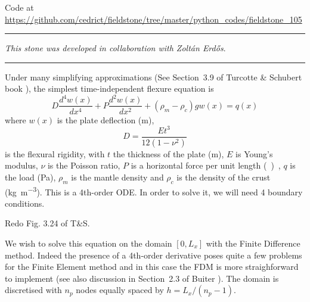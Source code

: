 

\begin{center}
Code at \url{https://github.com/cedrict/fieldstone/tree/master/python_codes/fieldstone_105}
\end{center}

\par\noindent\rule{\textwidth}{0.4pt}

{\sl This stone was developed in collaboration with Zolt{\'a}n Erd{\H{o}}s}. 

\par\noindent\rule{\textwidth}{0.4pt}


Under many simplifying approximations (See Section~3.9 of Turcotte \& Schubert book \cite{tusc}), 
the simplest time-independent flexure equation is
\[
D \frac{d^4w(x)}{dx^4} + P \frac{d^2w(x)}{dx^2} + (\rho_m-\rho_c)g w(x) = q(x)
\]
where $w(x)$ is the plate deflection (\si{m}), 
\[
D=\frac{E t^3}{12(1-\nu^2)}
\]
is the flexural rigidity, with $t$ the thickness of the plate (\si{m}), 
$E$ is Young's modulus, $\nu$ is the Poisson ratio, 
$P$ is a horizontal force per unit length (\si{\kg\per\square\metre\square\sec}),  
$q$ is the load (\si{\pascal}), 
$\rho_m$ is the mantle density and $\rho_c$ is the density of the crust (\si{\kg\per\cubic\metre}).
This is a 4th-order ODE. In order to solve it, we will need 4 boundary conditions.

Redo Fig. 3.24 of T\&S. 

We wish to solve this equation on the domain $[0,L_x]$ with the Finite Difference method. 
Indeed the presence of a 4th-order derivative poses quite a few problems for the Finite Element 
method and in this case the FDM is more straighforward to implement (see also 
discussion in Section~2.3 of Buiter \cite{buiter_thesis}). 
The domain is discretised with $n_p$ nodes equally spaced by $h=L_x/(n_p-1)$.

